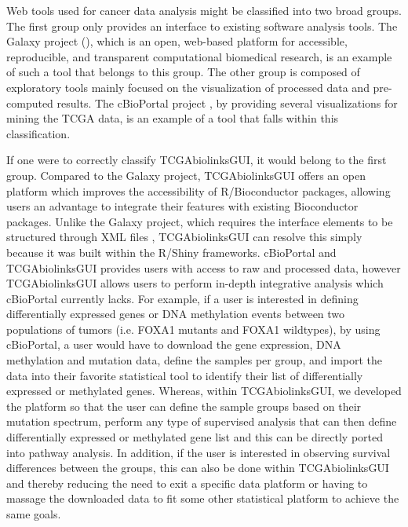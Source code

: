 Web tools used for cancer data analysis might be classified into two broad groups.
The first group only provides an interface to existing software analysis tools.
The Galaxy project (), which is an open, web-based platform for accessible, reproducible, and transparent computational biomedical research, is an example of such a tool that belongs to this group.
The other group is composed of exploratory tools mainly focused on the visualization of processed data and pre-computed results. The cBioPortal project \cite{gao2013integrative,cerami2012cbio}, by providing several visualizations for mining the TCGA data, is an example of a tool that falls within this classification.

If one were to correctly classify TCGAbiolinksGUI, it would belong to the first group. Compared to the Galaxy project, TCGAbiolinksGUI offers an open platform which improves the accessibility of R/Bioconductor packages, allowing users an advantage to integrate their features with existing Bioconductor packages. Unlike the Galaxy project, which requires the interface elements to be structured through XML files \cite{10.12688/f1000research.9821.1}, TCGAbiolinksGUI can resolve this simply because it was built within the R/Shiny frameworks. cBioPortal and TCGAbiolinksGUI provides users with access to raw and processed data, however TCGAbiolinksGUI allows users to perform in-depth integrative analysis which cBioPortal currently lacks.  For example, if a user is interested in defining differentially expressed genes or DNA methylation events between two populations of tumors (i.e. FOXA1 mutants and FOXA1 wildtypes), by using cBioPortal, a user would have to download the gene expression, DNA methylation and mutation data, define the samples per group, and import the data into their favorite statistical tool to identify their list of differentially expressed or methylated genes.  Whereas, within TCGAbiolinksGUI, we developed the platform so that the user can define the sample groups based on their mutation spectrum, perform any type of supervised analysis that can then define differentially expressed or methylated gene list and this can be directly ported into pathway analysis.  In addition, if the user is interested in observing survival differences between the groups, this can also be done within TCGAbiolinksGUI and thereby reducing the need to exit a specific data platform or having to massage the downloaded data to fit some other statistical platform to achieve the same goals.
